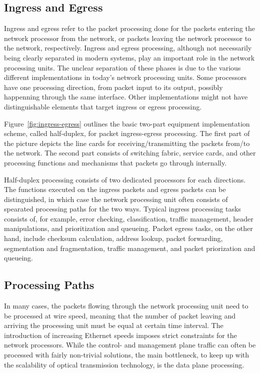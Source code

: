 \subsection{Ingress and Egress}
Ingress and egress refer to the packet processing done for the packets entering the network processor from the network, or packets leaving the network processor to the network, respectively. Ingress and egress processing, although not necessarily being clearly separated in modern systems, play an important role in the network processing units. The unclear separation of these phases is due to the various different implementations in today's network processing units. Some processors have one processing direction, from packet input to its output, possibly happenning through the same interface. Other implementations might not have distinguishable elements that target ingress or egress processing.~\cite{Giladi:2008:Network}

Figure~\ref{fig:ingress-egress} outlines the basic two-part equipment implementation scheme, called half-duplex, for packet ingress-egress processing. The first part of the picture depicts the line cards for receiving/transmitting the packets from/to the network. The second part consists of switching fabric, service cards, and other processing functions and mechanisms that packets go through internally.

Half-duplex processing consists of two dedicated processors for each directions. The functions executed on the ingress packets and egress packets can be distinguished, in which case the network processing unit often consists of spearated processing paths for the two ways. Typical ingress processing tasks consists of, for example, error checking, classification, traffic management, header manipulations, and prioritization and queueing. Packet egress tasks, on the other hand, include checksum calculation, address lookup, packet forwarding, segmentation and fragmentation, traffic management, and packet priorization and queueing.~\cite{Giladi:2008:Network}

\subsection{Processing Paths}
In many cases, the packets flowing through the network processing unit need to be processed at wire speed, meaning that the number of packet leaving and arriving the processing unit must be equal at certain time interval. The introduction of increasing Ethernet speeds imposes strict constraints for the network processors. While the control- and management plane traffic can often be processed with fairly non-trivial solutions, the main bottleneck, to keep up with the scalability of optical transmission technology, is the data plane processing.~\cite{Giladi:2008:Network}

